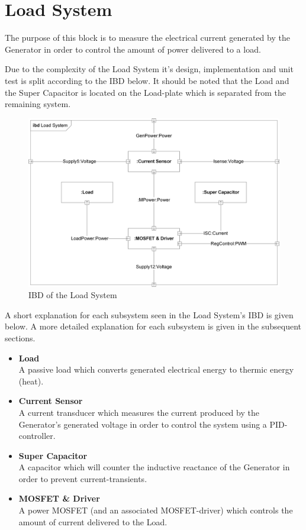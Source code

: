 \newpage
\section{Load System}
\label{sec:LoadSystem}
The purpose of this block is to measure the electrical current generated by the Generator in order to control the amount of power delivered to a load.

Due to the complexity of the Load System it's design, implementation and unit test is split according to the IBD below. It should be noted that the Load and the Super Capacitor is located on the Load-plate which is separated from the remaining system.

\begin{figure}[H]
	\centering
	\includegraphics[width=1\linewidth]{Hardware/Pictures/IBD_LoadSystem}
	\caption{IBD of the Load System}
	\label{fig:IBD_Load_System}
\end{figure}

A short explanation for each subsystem seen in the Load System's IBD is given below. A more detailed explanation for each subsystem is given in the subsequent sections.
\begin{itemize}
	\item \textbf{Load}\\
	A passive load which converts generated electrical energy to thermic energy (heat).
	\item \textbf{Current Sensor}\\
	A current transducer which measures the current produced by the Generator's generated voltage in order to control the system using a PID-controller.
	\item \textbf{Super Capacitor}\\
	A capacitor which will counter the inductive reactance of the Generator in order to prevent current-transients.
	\item \textbf{MOSFET \& Driver}\\
	A power MOSFET (and an associated MOSFET-driver) which controls the amount of current delivered to the Load.
\end{itemize}
\newpage

